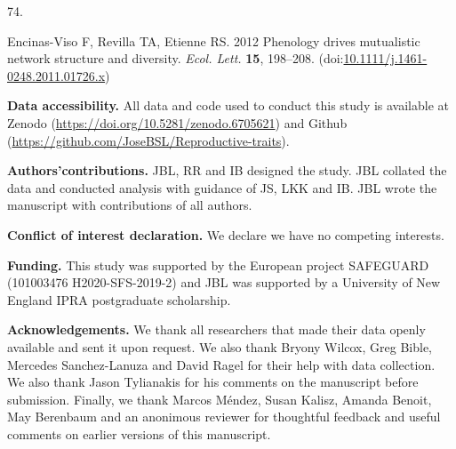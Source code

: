 \documentclass[
  12pt,
  a4paper,
]{article}
\newlength{\cslhangindent}
\newlength{\csllabelwidth}
\newlength{\cslentryspacingunit} %
\newenvironment{CSLReferences}[2] %
 {%
  \setlength{\parindent}{0pt}
  \ifodd #1
  \let\oldpar\par
  \def\par{\hangindent=\cslhangindent\oldpar}
  \fi
  \setlength{\parskip}{#2\cslentryspacingunit}
 }%
 {}
\newcommand{\CSLLeftMargin}[1]{\parbox[t]{\csllabelwidth}{#1}}
\newcommand{\CSLRightInline}[1]{\parbox[t]{\linewidth - \csllabelwidth}{#1}\break}
\begin{document}
\begin{CSLReferences}{0}{0}
\leavevmode{}%
\CSLLeftMargin{74. }
\CSLRightInline{Encinas-Viso F, Revilla TA, Etienne RS. 2012 Phenology drives mutualistic network structure and diversity. \emph{Ecol. Lett.} \textbf{15}, 198--208. (doi:\href{https://doi.org/10.1111/j.1461-0248.2011.01726.x}{10.1111/j.1461-0248.2011.01726.x})}

\end{CSLReferences}

\textbf{Data accessibility.} All data and code used to conduct this study is available at Zenodo (\url{https://doi.org/10.5281/zenodo.6705621}) and Github (\url{https://github.com/JoseBSL/Reproductive-traits}).

\textbf{Authors'contributions.} JBL, RR and IB designed the study. JBL collated the data and conducted analysis with guidance of JS, LKK and IB. JBL wrote the manuscript with contributions of all authors.

\textbf{Conflict of interest declaration.} We declare we have no competing interests.

\textbf{Funding.} This study was supported by the European project SAFEGUARD (101003476 H2020-SFS-2019-2) and JBL was supported by a University of New England IPRA postgraduate scholarship.

\textbf{Acknowledgements.} We thank all researchers that made their data openly available and sent it upon request. We also thank Bryony Wilcox, Greg Bible, Mercedes Sanchez-Lanuza and David Ragel for their help with data collection. We also thank Jason Tylianakis for his comments on the manuscript before submission. Finally, we thank Marcos Méndez, Susan Kalisz, Amanda Benoit, May Berenbaum and an anonimous reviewer for thoughtful feedback and useful comments on earlier versions of this manuscript.
\end{document}
